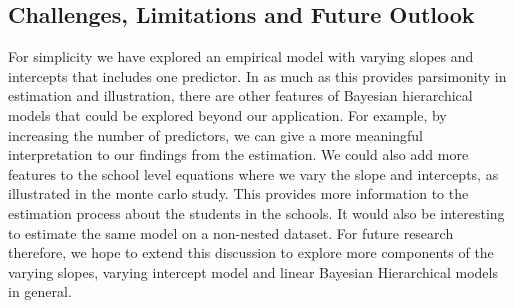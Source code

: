 \subsection{Challenges, Limitations and Future Outlook}
For simplicity we have explored an empirical model with varying slopes and intercepts that includes one predictor. In as much as this provides parsimonity in estimation and illustration, there are other features of Bayesian hierarchical models that could be explored beyond our application. For example, by increasing the number of predictors, we can give a more meaningful interpretation to our findings from the estimation. We could also add more features to the school level equations where we vary the slope and intercepts, as illustrated in the monte carlo study. This provides more information to the estimation process about the students in the schools. It would also be interesting to estimate the same model on a non-nested dataset. For future research therefore, we hope to extend this discussion to explore more components of the varying slopes, varying intercept model and linear Bayesian Hierarchical models in general.
